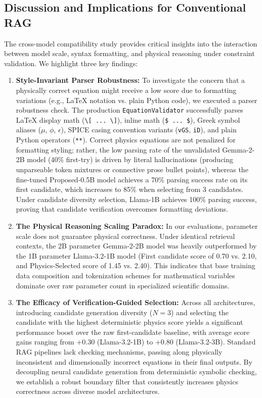 \documentclass[a4paper,fleqn]{cas-sc}
\begin{document}
\subsection{Discussion and Implications for Conventional RAG}
The cross-model compatibility study provides critical insights into the interaction between model scale, syntax formatting, and physical reasoning under constraint validation. We highlight three key findings:
\begin{enumerate}
    \item \textbf{Style-Invariant Parser Robustness:} To investigate the concern that a physically correct equation might receive a low score due to formatting variations (e.g., LaTeX notation vs. plain Python code), we executed a parser robustness check. The production \texttt{EquationValidator} successfully parses LaTeX display math (\texttt{\textbackslash[ ... \textbackslash]}), inline math (\texttt{\$ ... \$}), Greek symbol aliases ($\mu$, $\phi$, $\epsilon$), SPICE casing convention variants (\texttt{vGS}, \texttt{iD}), and plain Python operators (\texttt{**}). Correct physics equations are not penalized for formatting styling; rather, the low parsing rate of the unvalidated Gemma-2-2B model (40\% first-try) is driven by literal hallucinations (producing unparseable token mixtures or connective prose bullet points), whereas the fine-tuned Proposed-0.5B model achieves a 70\% parsing success rate on its first candidate, which increases to 85\% when selecting from 3 candidates. Under candidate diversity selection, Llama-1B achieves 100\% parsing success, proving that candidate verification overcomes formatting deviations.
    \item \textbf{The Physical Reasoning Scaling Paradox:} In our evaluations, parameter scale does not guarantee physical correctness. Under identical retrieval contexts, the 2B parameter Gemma-2-2B model was heavily outperformed by the 1B parameter Llama-3.2-1B model (First candidate score of 0.70 vs. 2.10, and Physics-Selected score of 1.45 vs. 2.40). This indicates that base training data composition and tokenization schemes for mathematical variables dominate over raw parameter count in specialized scientific domains.
    \item \textbf{The Efficacy of Verification-Guided Selection:} Across all architectures, introducing candidate generation diversity ($N=3$) and selecting the candidate with the highest deterministic physics score yields a significant performance boost over the raw first-candidate baseline, with average score gains ranging from +0.30 (Llama-3.2-1B) to +0.80 (Llama-3.2-3B). Standard RAG pipelines lack checking mechanisms, passing along physically inconsistent and dimensionally incorrect equations in their final outputs. By decoupling neural candidate generation from deterministic symbolic checking, we establish a robust boundary filter that consistently increases physics correctness across diverse model architectures.
\end{enumerate}
\end{document}
